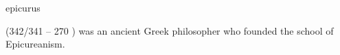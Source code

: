 \documentclass{stex}
\begin{document}
\begin{smodule}{epicurus}
\begin{sparagraph}[style=symdoc]
 (342/341 \BCE{} -- 270 \BCE{}) was an ancient Greek
philosopher who founded the school of Epicureanism.
\end{sparagraph}
\end{smodule}
\end{document}
